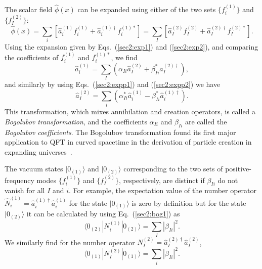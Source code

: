 \documentclass[12pt,nofootinbib,floatfix,aps,prd,showpacs,amsmath,amssymb,eqsecnum]{revtex4-2}
\let\cite\citep
\begin{document}
The scalar field $\hat{\phi}(x)$ 
can be expanded using either of the two sets $\{f_i^{(1)}\}$ and 
$\{f_I^{(2)}\}$:
\begin{equation}
\hat{\phi}(x) = 
\sum_i \left[ \hat{a}_i^{(1)}f_i^{(1)} + \hat{a}_i^{(1)\dagger}
f_i^{(1)*}\right] 
 =  \sum_I\left[ \hat{a}_I^{(2)}f_I^{(2)} + \hat{a}_I^{(2)\dagger}
f_I^{(2)*}\right].
\end{equation}
Using the expansion given by Eqs.~(\ref{sec2:exp1}) and (\ref{sec2:exp2}),
and comparing the coefficients of $f_i^{(1)}$ and $f_i^{(1)*}$, we find
\begin{equation}
\hat{a}_i^{(1)} = \sum_I (\alpha_{Ii}\hat{a}_I^{(2)} 
+ \beta_{Ii}^* \hat{a}_I^{(2)\dagger}), \label{sec2:bog1}
\end{equation} 
and similarly by using 
Eqs.~(\ref{sec2:expp1}) and (\ref{sec2:expp2}) we have
\begin{equation}
\hat{a}_I^{(2)} = \sum_i (\alpha_{Ii}^*\hat{a}_i^{(1)} 
- \beta_{Ii}^* \hat{a}_i^{(1)\dagger}). \label{sec2:bog2}
\end{equation}
This transformation, which mixes annihilation and creation operators, 
is called a
{\em Bogolubov transformation}, 
and the coefficients $\alpha_{Ii}$ and $\beta_{Ii}$
are called the {\em Bogolubov coefficients}.  
The Bogolubov transformation found its
first major application to QFT in curved spacetime in
the derivation of particle creation in expanding
universes~\cite{Parker68,Sexletal69}. 

The vacuum states $|0_{(1)}\rangle$ and $|0_{(2)}\rangle$ 
corresponding to the two sets of positive-frequency modes 
$\{f_i^{(1)}\}$ and $\{f_I^{(2)}\}$, respectively, are distinct if 
$\beta_{Ii}$ do not vanish for all $I$ and $i$.  For example, the
expectation value of the number operator
$\hat{N}^{(1)}_i = \hat{a}_i^{(1)\dagger}\hat{a}_i^{(1)}$ for the state
$|0_{(1)}\rangle$ is zero by definition but for the state
$|0_{(2)}\rangle$ it can be calculated by using Eq.~(\ref{sec2:bog1}) as
\begin{equation}
\langle 0_{(2)}|N^{(1)}_i|0_{(2)}\rangle  = \sum_I |\beta_{Ii}|^2.
\end{equation}
We similarly find for the number operator 
$N^{(2)}_I = \hat{a}_I^{(2)\dagger}\hat{a}_I^{(2)}$,
\begin{equation}
\langle 0_{(1)}|N^{(2)}_I|0_{(1)}\rangle = \sum_i |\beta_{Ii}|^2.
\end{equation}
\end{document}
